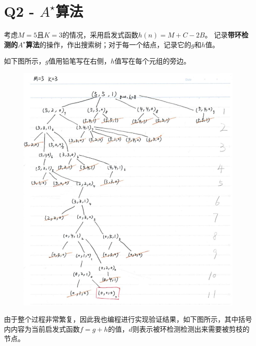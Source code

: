\documentclass[a4paper, 11pt]{article}
\begin{document}
\section{Q2 - $A^\star$算法}
\begin{question}[传教士与野人问题]
考虑$M=5$且$K=3$的情况，采用启发式函数$h(n)=M+C-2B$。
记录\textbf{带环检测的$A^\star$算法}的操作，作出搜索树；对于每一个结点，记录它的$g$和$h$值。
\end{question}
\begin{answer}
如下图所示，$g$值用铅笔写在右侧，$h$值写在每个元组的旁边。
\begin{figure}[H]
\centering
\includegraphics[width=\linewidth]{fig/A2-1.png}
\end{figure}
由于整个过程非常繁复，因此我也编程进行实现验证结果，如下图所示，其中括号内内容为当前启发式函数$f=g+h$的值，$d$则表示被环检测检测出来需要被剪枝的节点。
\begin{figure}[H]
\centering

\end{figure}
\end{answer}
\end{document}
